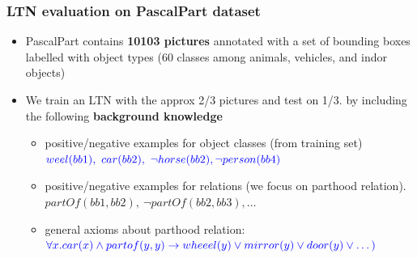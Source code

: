 \documentclass[xcolor=pdftex,dvipsnames,table]{beamer}
\def\imp{\rightarrow}
\begin{document}
\begin{frame}
\frametitle{LTN evaluation on PascalPart dataset}
\begin{itemize}
\item PascalPart contains \textbf{10103 pictures} annotated with a set
  of bounding boxes labelled with object types (60 classes among
  animals, vehicles, and indor objects)   
\item We train an LTN with the approx 2/3 pictures and test on 1/3.
  by including the following \textbf{background knowledge}
  \begin{itemize}
    \item positive/negative examples for object classes (from training set)
      $\color{blue}weel(bb1),\ car(bb2),\ \neg horse(bb2),\neg person(bb4)$

    \item positive/negative examples for relations (we focus on
      parthood relation). {\color{blue} $partOf(bb1,bb2),\ \neg partOf(bb2,bb3),\dots$}
    \item general axioms about parthood relation:
      $\color{blue}\forall x. car(x)\wedge partof(y,y)\imp wheeel(y)\vee mirror(y)
      \vee door(y)\vee \dots) $
    \end{itemize}
\end{itemize}
\end{frame}
\end{document}
